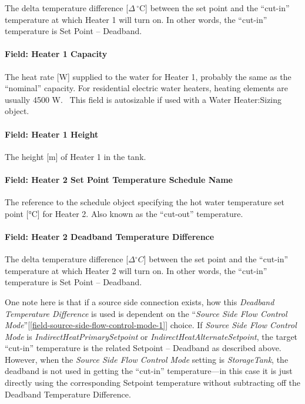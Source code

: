 The delta temperature difference {[}\(\Delta\,^{\circ}\mathrm{C}\){]} between the set point and the ``cut-in'' temperature at which Heater 1 will turn on. In other words, the ``cut-in'' temperature is Set Point -- Deadband.

\paragraph{Field: Heater 1 Capacity}\label{field-heater-1-capacity}

The heat rate {[}W{]} supplied to the water for Heater 1, probably the same as the ``nominal'' capacity. For residential electric water heaters, heating elements are usually 4500 W.~ This field is autosizable if used with a Water Heater:Sizing object.

\paragraph{Field: Heater 1 Height}\label{field-heater-1-height}

The height {[}m{]} of Heater 1 in the tank.

\paragraph{Field: Heater 2 Set Point Temperature Schedule Name}\label{field-heater-2-set-point-temperature-schedule-name}

The reference to the schedule object specifying the hot water temperature set point {[}°C{]} for Heater 2. Also known as the ``cut-out'' temperature.

\paragraph{Field: Heater 2 Deadband Temperature Difference}\label{field-heater-2-deadband-temperature-difference}

The delta temperature difference {[}$\Delta{^\circ}C${]} between the set point and the ``cut-in'' temperature at which Heater 2 will turn on. In other words, the ``cut-in'' temperature is Set Point -- Deadband.

One note here is that if a source side connection exists, how this \emph{Deadband Temperature Difference} is used is dependent on the ``\emph{Source Side Flow Control Mode}''{[}\ref{field-source-side-flow-control-mode-1}{]} choice. If \emph{Source Side Flow Control Mode} is \emph{IndirectHeatPrimarySetpoint} or
\emph{IndirectHeatAlternateSetpoint}, the target ``cut-in'' temperature is the related Setpoint -- Deadband as described above. However, when the \emph{Source Side Flow Control Mode} setting is \emph{StorageTank}, the deadband is not used in getting the ``cut-in'' temperature---in this case it is just directly using the corresponding Setpoint temperature without subtracting off the Deadband Temperature Difference.

